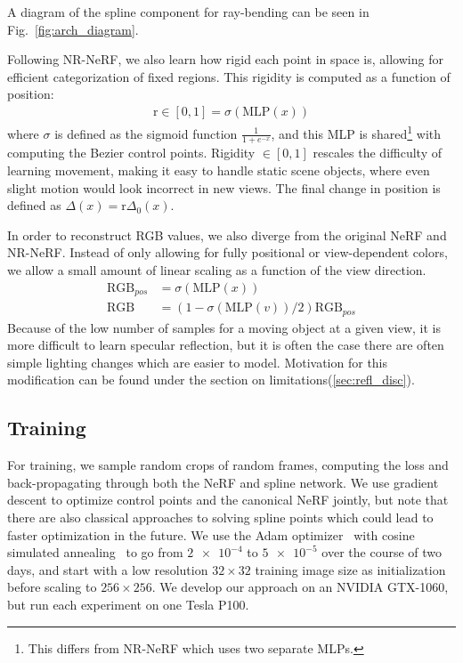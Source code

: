\noindent
A diagram of the spline component for ray-bending can be seen in Fig.~\ref{fig:arch_diagram}.

Following NR-NeRF, we also learn how rigid each point in space is, allowing for efficient categorization of fixed regions. This rigidity is computed as a function of position:
\begin{align}
  \text{r}\in[0,1] =\sigma(\text{MLP}(x))\label{eq:rigidity_defn}
\end{align}
where $\sigma$ is defined as the sigmoid function $\frac{1}{1+e^{-x}}$, and this MLP is shared\footnote{This differs from NR-NeRF which uses two separate MLPs.} with computing the Bezier control points. Rigidity $\in[0,1]$ rescales the
difficulty of learning movement, making it easy to handle static scene
objects, where even slight motion would look incorrect in new views. The final change in position is defined as $\Delta(x) = \text{r}
\Delta_0(x)$.

In order to reconstruct RGB values, we also diverge from the original NeRF and NR-NeRF. Instead of only allowing for fully positional or view-dependent colors, we allow a small amount of linear scaling as a function of the view direction.
\begin{align}
  \text{RGB}_{pos} &= \sigma(\text{MLP}(x)) \nonumber \\
  \text{RGB} &= (1-\sigma(\text{MLP}(v))/2)\text{RGB}_{pos} \label{eq:refl_defn}
\end{align}
Because of the low number of
samples for a moving object at a given view, it is more difficult to learn specular
reflection, but it is often the case there are often simple lighting changes which are easier to model. Motivation for this modification can be found under the section on limitations(\ref{sec:refl_disc}).

\subsection*{Training}

For training, we sample random crops of random frames, computing the loss and back-propagating through both the NeRF and spline network. We use gradient descent to optimize control points and the canonical NeRF jointly, but note that there are also classical approaches to solving spline points which could lead to faster optimization in the future. We use the Adam optimizer~\cite{Kingma2015AdamAM} with cosine simulated annealing~\cite{loshchilov2017sgdr} to go from $\num{2e-4}$ to $\num{5e-5}$ over the course of two days, and start with a low resolution $32\times32$ training image size as initialization before scaling to $256\times256$. We develop our approach on an NVIDIA GTX-1060, but run each experiment on one Tesla P100.

